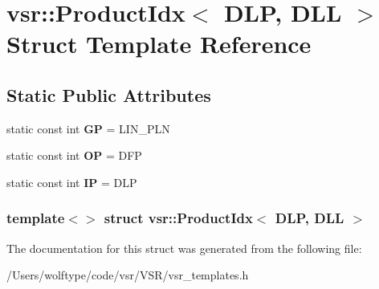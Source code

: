 \hypertarget{structvsr_1_1_product_idx_3_01_d_l_p_00_01_d_l_l_01_4}{\section{vsr\-:\-:Product\-Idx$<$ D\-L\-P, D\-L\-L $>$ Struct Template Reference}
\label{structvsr_1_1_product_idx_3_01_d_l_p_00_01_d_l_l_01_4}
}
\subsection*{Static Public Attributes}
\begin{DoxyCompactItemize}
\item 
\hypertarget{structvsr_1_1_product_idx_3_01_d_l_p_00_01_d_l_l_01_4_ae4ba44590ab40d36045c35427cf90d6e}{static const int {\bfseries G\-P} = L\-I\-N\-\_\-\-P\-L\-N}\label{structvsr_1_1_product_idx_3_01_d_l_p_00_01_d_l_l_01_4_ae4ba44590ab40d36045c35427cf90d6e}

\item 
\hypertarget{structvsr_1_1_product_idx_3_01_d_l_p_00_01_d_l_l_01_4_add482c969835189d8b321685357a334f}{static const int {\bfseries O\-P} = D\-F\-P}\label{structvsr_1_1_product_idx_3_01_d_l_p_00_01_d_l_l_01_4_add482c969835189d8b321685357a334f}

\item 
\hypertarget{structvsr_1_1_product_idx_3_01_d_l_p_00_01_d_l_l_01_4_a3cbbba6a88fbedd62b312542f64617c7}{static const int {\bfseries I\-P} = D\-L\-P}\label{structvsr_1_1_product_idx_3_01_d_l_p_00_01_d_l_l_01_4_a3cbbba6a88fbedd62b312542f64617c7}

\end{DoxyCompactItemize}
\subsubsection*{template$<$$>$ struct vsr\-::\-Product\-Idx$<$ D\-L\-P, D\-L\-L $>$}



The documentation for this struct was generated from the following file\-:\begin{DoxyCompactItemize}
\item 
/\-Users/wolftype/code/vsr/\-V\-S\-R/vsr\-\_\-templates.\-h\end{DoxyCompactItemize}
